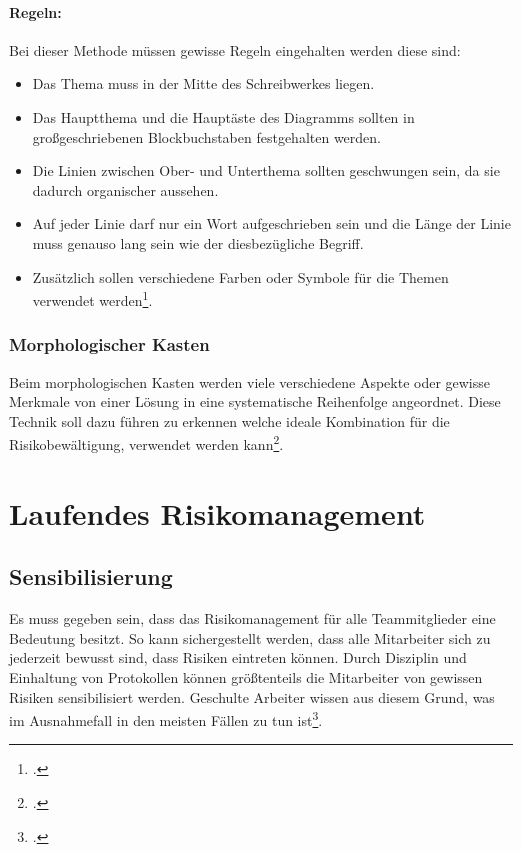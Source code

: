 \paragraph{Regeln:} Bei dieser Methode müssen gewisse Regeln eingehalten werden diese sind:
\begin{itemize}
	\item Das Thema muss in der Mitte des Schreibwerkes liegen.
	\item Das Hauptthema und die Hauptäste des Diagramms sollten in großgeschriebenen Blockbuchstaben festgehalten werden.
	\item Die Linien zwischen Ober- und Unterthema sollten geschwungen sein, da sie dadurch organischer aussehen.
	\item Auf jeder Linie darf nur ein Wort aufgeschrieben sein und die Länge der Linie muss genauso lang sein wie der diesbezügliche Begriff.
	\item Zusätzlich sollen verschiedene Farben oder Symbole für die Themen verwendet werden\footcite{risikomanagement-diplomarbeit-methoden}.
\end{itemize}

\subsubsection{Morphologischer Kasten}
Beim morphologischen Kasten werden viele verschiedene Aspekte oder gewisse Merkmale von einer Lösung in eine systematische Reihenfolge angeordnet. Diese Technik soll dazu führen zu erkennen welche ideale Kombination für die Risikobewältigung, verwendet werden kann\footcite{risikomanagement-diplomarbeit-methoden}.

\section{Laufendes Risikomanagement}
\subsection{Sensibilisierung}
Es muss gegeben sein, dass das Risikomanagement für alle Teammitglieder eine Bedeutung besitzt. So kann sichergestellt werden, dass alle Mitarbeiter sich zu jederzeit bewusst sind, dass Risiken eintreten können. Durch Disziplin und Einhaltung von Protokollen können größtenteils die Mitarbeiter von gewissen Risiken sensibilisiert werden. Geschulte Arbeiter wissen aus diesem Grund, was im Ausnahmefall in den meisten Fällen zu tun ist\footcite{bva-risikomanagement}.

